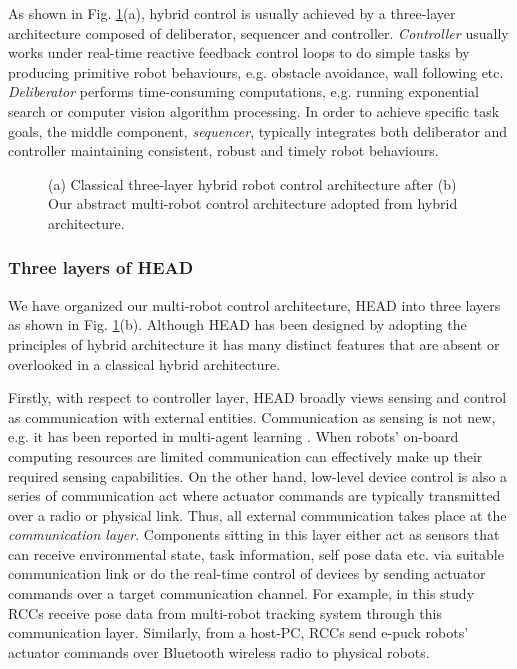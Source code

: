 As shown in Fig. \ref{fig:3-layer-arch}(a), hybrid control is usually achieved by a three-layer architecture composed of deliberator, sequencer and controller. {\em Controller} usually works under real-time reactive feedback control loops to do simple tasks by producing primitive robot behaviours, e.g. obstacle avoidance, wall following etc. {\em Deliberator} performs time-consuming computations, e.g. running exponential search or computer vision algorithm processing. In order to achieve specific task goals, the middle component, {\em sequencer}, typically integrates both deliberator and controller maintaining consistent, robust and timely robot behaviours.
\begin{figure}
\centering
{} 
\hspace{0.25cm}
\caption{(a) Classical three-layer hybrid robot control architecture after \protect{} 
(b) Our abstract multi-robot control architecture adopted from hybrid architecture.}
\label{fig:3-layer-arch}
\end{figure}
\subsubsection*{Three layers of HEAD}
We have organized our multi-robot control architecture, HEAD into three layers as shown in Fig. \ref{fig:3-layer-arch}(b). Although HEAD has been designed by adopting the principles of hybrid architecture it has many distinct features that are absent or overlooked in a classical hybrid architecture. 

Firstly, with respect to controller layer, HEAD broadly views sensing and control as communication with external entities. Communication as sensing is not new, e.g. it has been reported in multi-agent learning \cite{Mataric1998}. When robots' on-board computing resources are limited communication can effectively make up their required sensing capabilities. On the other hand, low-level device control is also a series of communication act where actuator commands are typically transmitted over a radio or physical link. Thus, all external communication takes place at the {\em communication layer}. Components sitting in this layer either act as sensors that can receive environmental state, task information, self pose data etc. via suitable communication link or do the real-time control of devices by sending actuator commands over a target communication channel. For example, in this study RCCs receive pose data from multi-robot tracking system through this communication layer.  Similarly, from a host-PC, RCCs send e-puck robots' actuator commands over Bluetooth wireless radio to physical robots.

